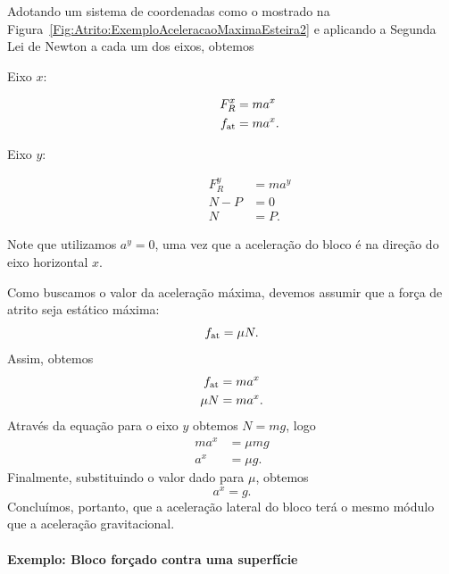 Adotando um sistema de coordenadas como o mostrado na Figura~\ref{Fig:Atrito:ExemploAceleracaoMaximaEsteira2} e aplicando a Segunda Lei de Newton a cada um dos eixos, obtemos
\begin{description}
    \item[Eixo $x$:]
        \begin{align}
            F_R^x &= m a^x \\
            f_{\rm{at}} &= m a^x.
        \end{align}
        
    \item[Eixo $y$:]
        \begin{align}
            F_R^y &= m a^y \\
            N - P &= 0 \\
            N &= P.
        \end{align}
\end{description}
%
Note que utilizamos $a^y = 0$, uma vez que a aceleração do bloco é na direção do eixo horizontal $x$.

Como buscamos o valor da aceleração máxima, devemos assumir que a força de atrito seja estático máxima:
\begin{equation}
    f_{\rm{at}} = \mu N.
\end{equation}
%
Assim, obtemos
\begin{align}
    f_{\rm{at}} &= m a^x \\
    \mu N &= m a^x.
\end{align}
%
Através da equação para o eixo $y$ obtemos $N = mg$, logo
\begin{align}
    m a^x &= \mu mg \\
    a^x &= \mu g.
\end{align}
%
Finalmente, substituindo o valor dado para $\mu$, obtemos
\begin{equation}
    a^x = g.
\end{equation}
%
Concluímos, portanto, que a aceleração lateral do bloco terá o mesmo módulo que a aceleração gravitacional.
 
\paragraph{Exemplo: Bloco forçado contra uma superfície}

